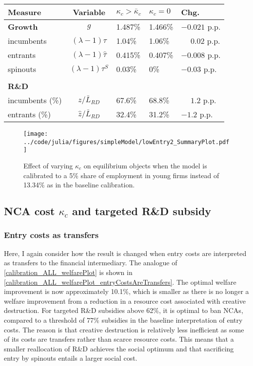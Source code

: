 \documentclass[11pt,english]{article}
\theoremstyle{definition}
\begin{document}
\begin{table}[]
	\centering
	\label{reducing_kappa_c_decomposition_table_lowEntry}
	\begin{tabular}{lclll}
		\toprule \toprule
		Measure & Variable & $\kappa_c > \bar{\kappa}_c$ & $\kappa_c = 0$ & Chg. \tabularnewline
		\midrule
		\textbf{Growth} & $g$ & 1.487\% & 1.466\% & $-0.021$ p.p.\tabularnewline
		\multicolumn{1}{l}{\quad incumbents} & $(\lambda -1) \tau$  & 1.04\% & 1.06\% & $\phantom{-}0.02$ p.p. \tabularnewline
		\multicolumn{1}{l}{\quad entrants} & $(\lambda -1) \hat{\tau}$ & 0.415\% & 0.407\% & $-0.008$ p.p. \tabularnewline
		\multicolumn{1}{l}{\quad spinouts} & $(\lambda -1) \tau^S$ & 0.03\% & 0\% & $-0.03$ p.p. \tabularnewline
		\tabularnewline
		\textbf{R\&D} & & & & 
		\tabularnewline
		\multicolumn{1}{l}{\quad incumbents (\%)}  & $z / \bar{L}_{RD}$ & 67.6\% & 68.8\% & $\phantom{-} 1.2$ p.p. \tabularnewline 
		
		\multicolumn{1}{l}{\quad entrants (\%)}  & $\hat{z} / \bar{L}_{RD}$ & 32.4\% & 31.2\% & $-1.2$ p.p. \tabularnewline
		\bottomrule
	\end{tabular}
\end{table}


\begin{figure}[]
	\centering
	\texttt{[image: ../code/julia/figures/simpleModel/lowEntry2\_SummaryPlot.pdf]}
	\caption{Effect of varying $\kappa_c$ on equilibrium objects when the model is calibrated to a 5\% share of employment in young firms instead of 13.34\% as in the baseline calibration.}
	\label{calibration_lowEntry_summaryPlot}
\end{figure}


\newpage 
\subsection{NCA cost $\kappa_c$ and targeted R\&D subsidy}\label{appendix:policyanalysis:allpolicies}

\subsubsection{Entry costs as transfers}

Here, I again consider how the result is changed when entry costs are interpreted as transfers to the financial intermediary. The analogue of \autoref{calibration_ALL_welfarePlot} is shown in \autoref{calibration_ALL_welfarePlot_entryCostsAreTransfers}. The optimal welfare improvement is now approximately 10.1\%, which is smaller as there is no longer a welfare improvement from a reduction in a resource cost associated with creative destruction. For targeted R\&D subsidies above 62\%, it is optimal to ban NCAs, compared to a threshold of 77\% subsidies in the baseline interpretation of entry costs. The reason is that creative destruction is relatively less inefficient as some of its costs are transfers rather than scarce resource costs. This means that a smaller reallocation of R\&D achieves the social optimum and that sacrificing entry by spinouts entails a larger social cost. 
\end{document}
